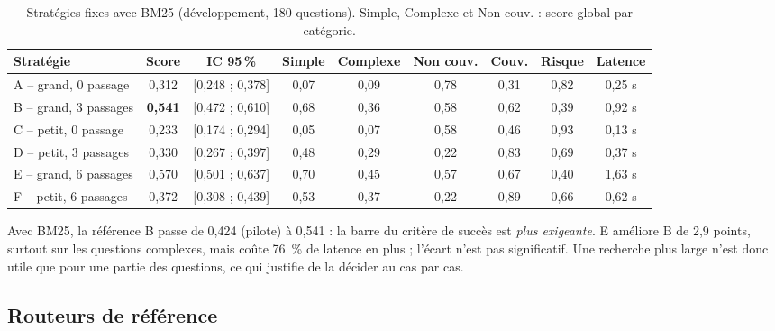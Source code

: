 \documentclass[11pt,a4paper]{article}
\begin{document}
\begin{table}[H]
\centering\footnotesize\setlength{\tabcolsep}{4pt}
\begin{tabular}{l c c c c c c c c}
\toprule
\textbf{Stratégie} & \textbf{Score} & \textbf{IC 95\,\%} & \textbf{Simple} & \textbf{Complexe} & \textbf{Non couv.} & \textbf{Couv.} & \textbf{Risque} & \textbf{Latence} \\
\midrule
A -- grand, 0 passage   & 0,312 & [0,248 ; 0,378] & 0,07 & 0,09 & 0,78 & 0,31 & 0,82 & 0,25 s \\
B -- grand, 3 passages  & \textbf{0,541} & [0,472 ; 0,610] & 0,68 & 0,36 & 0,58 & 0,62 & 0,39 & 0,92 s \\
C -- petit, 0 passage   & 0,233 & [0,174 ; 0,294] & 0,05 & 0,07 & 0,58 & 0,46 & 0,93 & 0,13 s \\
D -- petit, 3 passages  & 0,330 & [0,267 ; 0,397] & 0,48 & 0,29 & 0,22 & 0,83 & 0,69 & 0,37 s \\
E -- grand, 6 passages  & 0,570 & [0,501 ; 0,637] & 0,70 & 0,45 & 0,57 & 0,67 & 0,40 & 1,63 s \\
F -- petit, 6 passages  & 0,372 & [0,308 ; 0,439] & 0,53 & 0,37 & 0,22 & 0,89 & 0,66 & 0,62 s \\
\bottomrule
\end{tabular}
\caption{Stratégies fixes avec BM25 (développement, 180 questions). Simple, Complexe et Non couv. :
score global par catégorie.}
\label{tab:strategies}
\end{table}

Avec BM25, la référence B passe de 0,424 (pilote) à 0,541 : la barre du critère de succès est
\emph{plus exigeante}. E améliore B de 2,9 points, surtout sur les questions complexes, mais coûte 76~\%
de latence en plus ; l'écart n'est pas significatif. Une recherche plus large n'est donc utile que pour
une partie des questions, ce qui justifie de la décider au cas par cas.

\subsection{Routeurs de référence}
\end{document}
